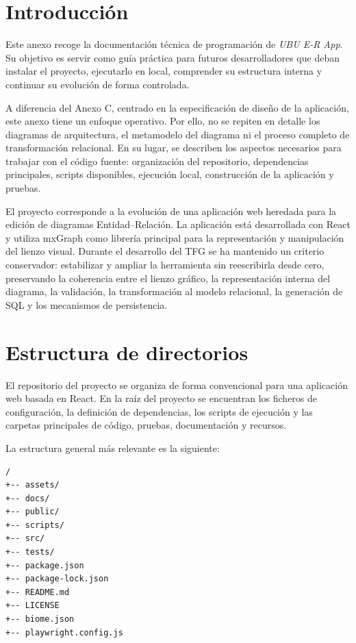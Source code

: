 
\section{Introducción}

Este anexo recoge la documentación técnica de programación de \textit{UBU E-R App}. Su objetivo es servir como guía práctica para futuros desarrolladores que deban instalar el proyecto, ejecutarlo en local, comprender su estructura interna y continuar su evolución de forma controlada.

A diferencia del Anexo C, centrado en la especificación de diseño de la aplicación, este anexo tiene un enfoque operativo. Por ello, no se repiten en detalle los diagramas de arquitectura, el metamodelo del diagrama ni el proceso completo de transformación relacional. En su lugar, se describen los aspectos necesarios para trabajar con el código fuente: organización del repositorio, dependencias principales, scripts disponibles, ejecución local, construcción de la aplicación y pruebas.

El proyecto corresponde a la evolución de una aplicación web heredada para la edición de diagramas Entidad--Relación. La aplicación está desarrollada con React y utiliza mxGraph como librería principal para la representación y manipulación del lienzo visual. Durante el desarrollo del TFG se ha mantenido un criterio conservador: estabilizar y ampliar la herramienta sin reescribirla desde cero, preservando la coherencia entre el lienzo gráfico, la representación interna del diagrama, la validación, la transformación al modelo relacional, la generación de SQL y los mecanismos de persistencia.

\section{Estructura de directorios}

El repositorio del proyecto se organiza de forma convencional para una aplicación web basada en React. En la raíz del proyecto se encuentran los ficheros de configuración, la definición de dependencias, los scripts de ejecución y las carpetas principales de código, pruebas, documentación y recursos.

La estructura general más relevante es la siguiente:

\begin{verbatim}
/
+-- assets/
+-- docs/
+-- public/
+-- scripts/
+-- src/
+-- tests/
+-- package.json
+-- package-lock.json
+-- README.md
+-- LICENSE
+-- biome.json
+-- playwright.config.js
\end{verbatim}

